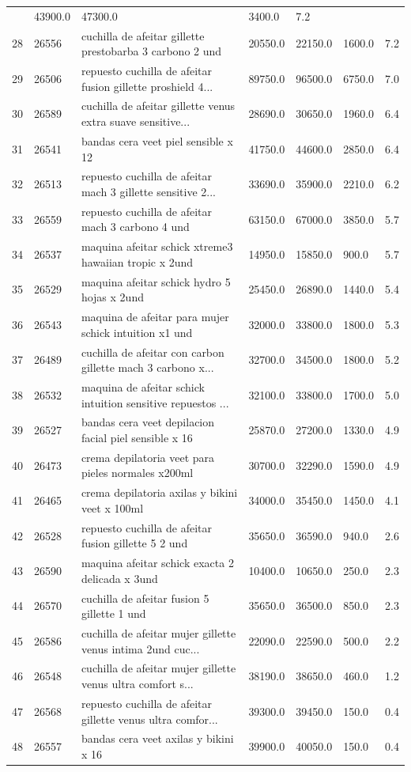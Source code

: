 \documentclass[
  spanish,
  letterpaper,
  DIV=11,
  numbers=noendperiod]{scrartcl}
\begin{document}
{\begin{longtable}[]{@{}lllllll@{}}
& 43900.0 & 47300.0 & 3400.0 & 7.2 \\
28 & 26556 & cuchilla de afeitar gillette prestobarba 3 carbono 2 und &
20550.0 & 22150.0 & 1600.0 & 7.2 \\
29 & 26506 & repuesto cuchilla de afeitar fusion gillette proshield 4...
& 89750.0 & 96500.0 & 6750.0 & 7.0 \\
30 & 26589 & cuchilla de afeitar gillette venus extra suave sensitive...
& 28690.0 & 30650.0 & 1960.0 & 6.4 \\
31 & 26541 & bandas cera veet piel sensible x 12 & 41750.0 & 44600.0 &
2850.0 & 6.4 \\
32 & 26513 & repuesto cuchilla de afeitar mach 3 gillette sensitive 2...
& 33690.0 & 35900.0 & 2210.0 & 6.2 \\
33 & 26559 & repuesto cuchilla de afeitar mach 3 carbono 4 und & 63150.0
& 67000.0 & 3850.0 & 5.7 \\
34 & 26537 & maquina afeitar schick xtreme3 hawaiian tropic x 2und &
14950.0 & 15850.0 & 900.0 & 5.7 \\
35 & 26529 & maquina afeitar schick hydro 5 hojas x 2und & 25450.0 &
26890.0 & 1440.0 & 5.4 \\
36 & 26543 & maquina de afeitar para mujer schick intuition x1 und &
32000.0 & 33800.0 & 1800.0 & 5.3 \\
37 & 26489 & cuchilla de afeitar con carbon gillette mach 3 carbono x...
& 32700.0 & 34500.0 & 1800.0 & 5.2 \\
38 & 26532 & maquina de afeitar schick intuition sensitive repuestos ...
& 32100.0 & 33800.0 & 1700.0 & 5.0 \\
39 & 26527 & bandas cera veet depilacion facial piel sensible x 16 &
25870.0 & 27200.0 & 1330.0 & 4.9 \\
40 & 26473 & crema depilatoria veet para pieles normales x200ml &
30700.0 & 32290.0 & 1590.0 & 4.9 \\
41 & 26465 & crema depilatoria axilas y bikini veet x 100ml & 34000.0 &
35450.0 & 1450.0 & 4.1 \\
42 & 26528 & repuesto cuchilla de afeitar fusion gillette 5 2 und &
35650.0 & 36590.0 & 940.0 & 2.6 \\
43 & 26590 & maquina afeitar schick exacta 2 delicada x 3und & 10400.0 &
10650.0 & 250.0 & 2.3 \\
44 & 26570 & cuchilla de afeitar fusion 5 gillette 1 und & 35650.0 &
36500.0 & 850.0 & 2.3 \\
45 & 26586 & cuchilla de afeitar mujer gillette venus intima 2und cuc...
& 22090.0 & 22590.0 & 500.0 & 2.2 \\
46 & 26548 & cuchilla de afeitar mujer gillette venus ultra comfort s...
& 38190.0 & 38650.0 & 460.0 & 1.2 \\
47 & 26568 & repuesto cuchilla de afeitar gillette venus ultra comfor...
& 39300.0 & 39450.0 & 150.0 & 0.4 \\
48 & 26557 & bandas cera veet axilas y bikini x 16 & 39900.0 & 40050.0 &
150.0 & 0.4 \\
\end{longtable}
}
\end{document}

